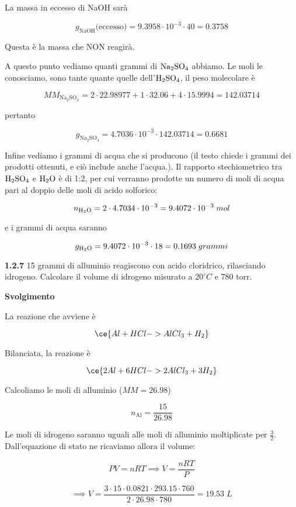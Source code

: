 La massa in eccesso di NaOH sarà

$$g_{\text{NaOH}}\text{(eccesso)}=9.3958 \cdot 10^{-3} \cdot 40=0.3758$$

Questa è la massa che NON reagirà.

A questo punto vediamo quanti grammi di $\rm Na_2SO_4$ abbiamo. Le moli le conosciamo, sono tante quante quelle dell'$\rm H_2SO_4$, il peso molecolare è

$$MM_{\text{Na}_2\text{SO}_4}=2\cdot22.98977 + 1 \cdot 32.06 + 4 \cdot 15.9994=142.03714$$

pertanto

$$g_{\text{Na}_2\text{SO}_4}
=4.7036 \cdot 10^{-3} \cdot 142.03714
=0.6681$$

Infine vediamo i grammi di acqua che si producono (il testo chiede i grammi dei prodotti ottenuti, e ciò include anche l'acqua.). Il rapporto stechiometrico tra $\rm H_2SO_4$ e $\rm H_2O$ è di 1:2, per cui verranno prodotte un numero di moli di acqua pari al doppio delle moli di acido solforico:

$$n_{\rm H_2O}= 2 \cdot 4.7034 \cdot 10^{-3}
=9.4072 \cdot 10^{-3}\;mol$$

e i grammi di acqua saranno

$$g_{\rm H_2O}=9.4072 \cdot 10^{-3} \cdot 18=0.1693\;grammi$$

\textbf{1.2.7} 15 grammi di alluminio reagiscono con acido cloridrico, rilasciando idrogeno. Calcolare il volume di idrogeno misurato a $20^{\circ}C$ e 780 torr.

\vspace{0.2cm}\large\textbf{Svolgimento}\normalsize

\vspace{0.2cm}La reazione che avviene è

$$\ce{Al + HCl -> AlCl_3 + H_2}$$

Bilanciata, la reazione è

$$\ce{2Al + 6HCl -> 2AlCl_3 + 3H_2}$$

Calcoliamo le moli di alluminio ($MM=26.98$)

$$n_{\text{Al}}=\frac{15}{26.98}$$

Le moli di idrogeno saranno uguali alle moli di alluminio moltiplicate per $\frac{3}{2}$. Dall'equazione di stato ne ricaviamo allora il volume:

$$PV=nRT \implies V=\frac{nRT}{P}$$

$$\implies V=\frac{3 \cdot 15 \cdot 0.0821 \cdot 293.15 \cdot 760}{2 \cdot 26.98 \cdot 780}=19.53\;L$$


